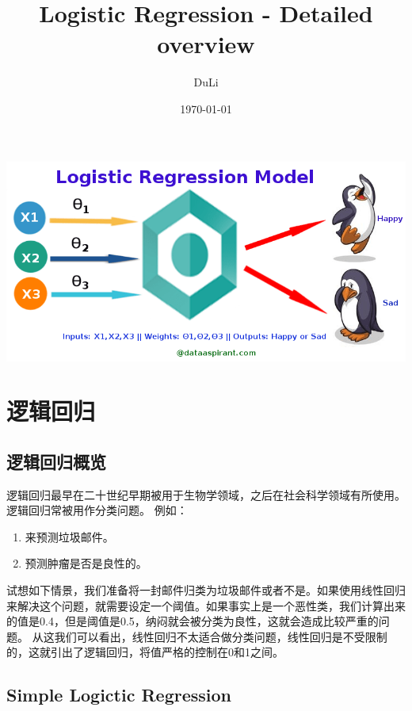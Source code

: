 \documentclass[UTF8]{ctexart}
\title{Logistic Regression - Detailed overview}
\author{DuLi}
\date{\today}
\begin{document}
\maketitle
\newpage

\begin{center}
\includegraphics[width = 6in]{Logistic.png}
\end{center}

\section{逻辑回归}
\subsection{逻辑回归概览}
逻辑回归最早在二十世纪早期被用于生物学领域，之后在社会科学领域有所使用。
逻辑回归常被用作分类问题。
例如：
\begin{enumerate}[*]

\item 来预测垃圾邮件。

\item 预测肿瘤是否是良性的。

\end{enumerate}

试想如下情景，我们准备将一封邮件归类为垃圾邮件或者不是。如果使用线性回归来解决这个问题，就需要设定一个阈值。如果事实上是一个恶性类，我们计算出来的值是0.4，但是阈值是0.5，纳闷就会被分类为良性，这就会造成比较严重的问题。
从这我们可以看出，线性回归不太适合做分类问题，线性回归是不受限制的，这就引出了逻辑回归，将值严格的控制在0和1之间。

\subsection{Simple Logictic Regression}
\label{sub:simple_logictic_regression}
\end{document}
